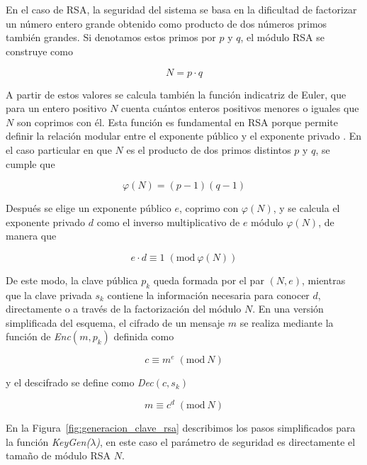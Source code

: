 \\
\\
En el caso de RSA, la seguridad del sistema se basa en la dificultad de factorizar un número entero grande obtenido como producto de dos números primos también grandes. Si denotamos estos primos por \(p\) y \(q\), el módulo RSA se construye como

\[
N = p \cdot q
\]

A partir de estos valores se calcula también la función indicatriz de Euler, que para un entero positivo \(N\) cuenta cuántos enteros positivos menores o iguales que \(N\) son coprimos con él. Esta función es fundamental en RSA porque permite definir la relación modular entre el exponente público y el exponente privado \citep{menezes1996handbook}. En el caso particular en que \(N\) es el producto de dos primos distintos \(p\) y \(q\), se cumple que

\[
\varphi(N) = (p-1)(q-1)
\]

Después se elige un exponente público \(e\), coprimo con \(\varphi(N)\), y se calcula el exponente privado \(d\) como el inverso multiplicativo de \(e\) módulo \(\varphi(N)\), de manera que

\[
e \cdot d \equiv 1 \;(\mathrm{mod}\ \varphi(N))
\]

De este modo, la clave pública $p_k$ queda formada por el par \((N,e)\), mientras que la clave privada $s_k$ contiene la información necesaria para conocer \(d\), directamente o a través de la factorización del módulo $N$. En una versión simplificada del esquema, el cifrado de un mensaje \(m\) se realiza mediante la función de \textit{Enc}$(m,p_k)$ definida como

\[
c \equiv m^e \;(\mathrm{mod}\ N)
\]

y el descifrado se define como \textit{Dec}$(c,s_k)$

\[
m \equiv c^d \;(\mathrm{mod}\ N)
\]

En la Figura~\ref{fig:generacion_clave_rsa} describimos los pasos simplificados para la función \textit{KeyGen($\lambda$)}, en este caso el parámetro de seguridad es directamente el tamaño de módulo RSA $N$.

